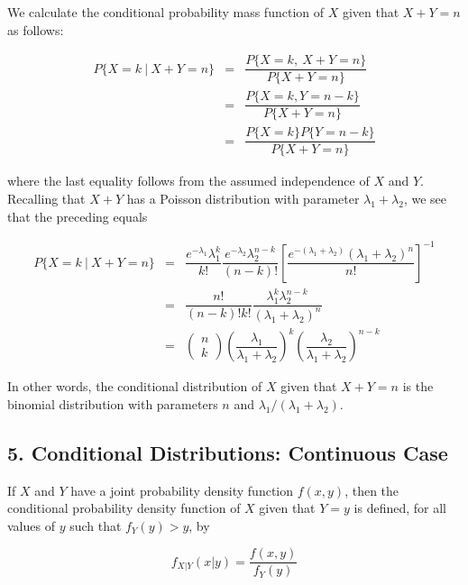 \begin{solution}
	We calculate the conditional probability mass function of $X$ given that $X + Y = n$ as follows:
	
	\begin{eqnarray*}
		P\{X = k ~|~ X + Y = n\} &=& \dfrac{P\{X = k,~X + Y = n\}}{P\{X + Y = n\}}\\
		&=& \dfrac{P\{X = k,Y = n-k\}}{P \{X + Y = n\}}\\
		&=& \dfrac{P \{X = k\}P\{Y = n - k\}}{P\{X + Y = n\}}
	\end{eqnarray*}
	
	where the last equality follows from the assumed independence of $X$ and $Y$. Recalling that $X + Y$ has a Poisson distribution with parameter $\lambda_1 + \lambda_2$, we see that the preceding equals
	
	\begin{eqnarray*}
		P\{X = k~|~ X + Y = n\} &=& \dfrac{e^{-\lambda_1} \lambda_1^k}{k!} \dfrac{e^{-\lambda_2} \lambda_2^{n - k}}{(n - k)!}\left[ \dfrac{e^{-(\lambda_1 + \lambda_2)} (\lambda_1 + \lambda_2)^n}{n!} \right]^{-1}\\
		&=& \dfrac{n!}{(n - k)!k!} \dfrac{\lambda_1^k \lambda_2^{n-k}}{(\lambda_1 + \lambda_2)^n}\\
		&=& \left( \begin{matrix}
			n \\ k
		\end{matrix}\right) \left( \dfrac{\lambda_1}{\lambda_1 + \lambda_2} \right)^k \left( \dfrac{\lambda_2}{\lambda_1 + \lambda_2} \right)^{n - k}
	\end{eqnarray*}
	
	In other words, the conditional distribution of $X$ given that $X + Y = n$ is the binomial distribution with parameters $n$ and $\lambda_1 / (\lambda_1 + \lambda_2)$.
	
\end{solution}

\newpage

\subsection*{5. Conditional Distributions: Continuous Case}

If $X$ and $Y$ have a joint probability density function $f(x,y)$, then the conditional probability density function of $X$ given that $Y = y$ is defined, for all values of $y$ such that $f_Y(y)  > y$, by

$$f_{X|Y}(x|y) = \dfrac{f(x,y)}{f_Y(y)}$$

